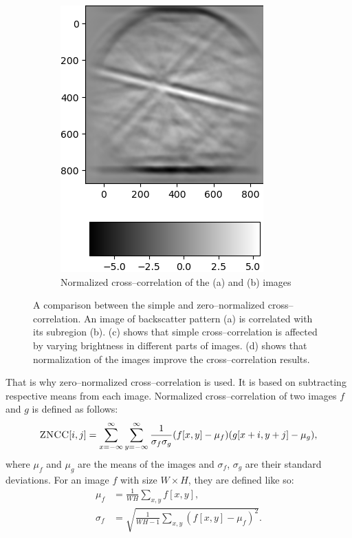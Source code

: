 \begin{figure}
\begin{subfigure}{.49\textwidth}
		\includegraphics[width=\linewidth]{img/normalized_corr}
		\caption{Normalized cross--correlation of the (a) and (b) images}
		\label{normalized-cross}
	\end{subfigure}
	
	\caption{A comparison between the simple and zero--normalized cross--correlation. An image of backscatter pattern (a) is correlated with its subregion (b). (c) shows that simple cross--correlation is affected by varying brightness in different parts of images. (d) shows that normalization of the images improve the cross--correlation results.}
\end{figure}

That is why zero--normalized cross--correlation is used. It is based on subtracting respective means from each image. Normalized cross--correlation of two images $f$ and $g$ is defined as follows:
\[
\textsc{ZNCC}[i,j] = \sum_{x=-\infty}^{\infty}\sum_{y=-\infty}^{\infty} \frac{1}{\sigma_f \sigma_g}(f[x,y] - \mu_f)(g[x+i,y+j] - \mu_g),
\]  
where $\mu_f$ and $\mu_g$ are the means of the images and $\sigma_f$, $\sigma_g$ are their standard deviations. For an image $f$ with size $W \times H$, they are defined like so:
\begin{align*}
\mu_f &= \frac{1}{WH} \sum_{x,y}{}f[x,y], \\
\sigma_f &= \sqrt{\frac{1}{WH-1} \sum_{x,y}(f[x,y]-\mu_f)^2}.
\end{align*}

